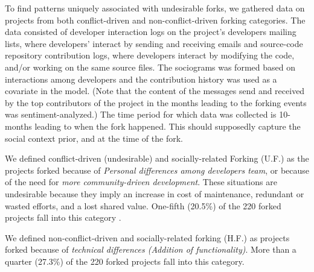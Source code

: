 \documentclass[12pt]{report}
\begin{document}
To find patterns uniquely associated with undesirable forks, we gathered data on projects from both conflict-driven and non-conflict-driven forking categories. The data consisted of developer interaction logs on the project's developers mailing lists, where developers' interact by sending and receiving emails and source-code repository contribution logs, where developers interact by modifying the code, and/or working on the same source files. The sociograms was formed based on interactions among developers and the contribution history was used as a covariate in the model. (Note that the content of the messages send and received by the top contributors of the project in the months leading to the forking events was sentiment-analyzed.) The time period for which data was collected is 10-months leading to when the fork happened. This should supposedly capture the social context prior, and at the time of the fork.

%

We defined conflict-driven (undesirable) and socially-related Forking (U.F.) as the projects forked because of \textit{Personal differences among developers team}, or because of the need for \textit{more community-driven development}. These situations are undesirable because they imply an increase in cost of maintenance, redundant or wasted efforts, and a lost shared value. One-fifth (20.5\%) of the 220 forked projects fall into this category \cite{Robles}.

We defined non-conflict-driven and socially-related forking (H.F.) as projects forked because of \textit{technical differences (Addition of functionality)}. More than a quarter (27.3\%) of the 220 forked projects fall into this category.
\end{document}
